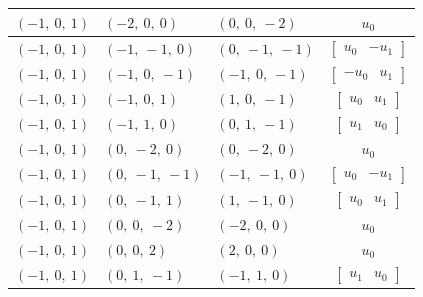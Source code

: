\documentclass[11pt]{article}
\theoremstyle{definition}
\begin{document}
\begin{longtable}{|l|l|l|c|}
    \hline
    $\left( -1, \  0, \  1\right)$ & $\left( -2, \  0, \  0\right)$ & $\left( 0, \  0, \  -2\right)$ & $u_{0}$ \\
    \hline
    $\left( -1, \  0, \  1\right)$ & $\left( -1, \  -1, \  0\right)$ & $\left( 0, \  -1, \  -1\right)$ & $\left[\begin{matrix}u_{0} & - u_{1}\end{matrix}\right]$ \\
    \hline
    $\left( -1, \  0, \  1\right)$ & $\left( -1, \  0, \  -1\right)$ & $\left( -1, \  0, \  -1\right)$ & $\left[\begin{matrix}- u_{0} & u_{1}\end{matrix}\right]$ \\
    \hline
    $\left( -1, \  0, \  1\right)$ & $\left( -1, \  0, \  1\right)$ & $\left( 1, \  0, \  -1\right)$ & $\left[\begin{matrix}u_{0} & u_{1}\end{matrix}\right]$ \\
    \hline
    $\left( -1, \  0, \  1\right)$ & $\left( -1, \  1, \  0\right)$ & $\left( 0, \  1, \  -1\right)$ & $\left[\begin{matrix}u_{1} & u_{0}\end{matrix}\right]$ \\
    \hline
    $\left( -1, \  0, \  1\right)$ & $\left( 0, \  -2, \  0\right)$ & $\left( 0, \  -2, \  0\right)$ & $u_{0}$ \\
    \hline
    $\left( -1, \  0, \  1\right)$ & $\left( 0, \  -1, \  -1\right)$ & $\left( -1, \  -1, \  0\right)$ & $\left[\begin{matrix}u_{0} & - u_{1}\end{matrix}\right]$ \\
    \hline
    $\left( -1, \  0, \  1\right)$ & $\left( 0, \  -1, \  1\right)$ & $\left( 1, \  -1, \  0\right)$ & $\left[\begin{matrix}u_{0} & u_{1}\end{matrix}\right]$ \\
    \hline
    $\left( -1, \  0, \  1\right)$ & $\left( 0, \  0, \  -2\right)$ & $\left( -2, \  0, \  0\right)$ & $u_{0}$ \\
    \hline
    $\left( -1, \  0, \  1\right)$ & $\left( 0, \  0, \  2\right)$ & $\left( 2, \  0, \  0\right)$ & $u_{0}$ \\
    \hline
    $\left( -1, \  0, \  1\right)$ & $\left( 0, \  1, \  -1\right)$ & $\left( -1, \  1, \  0\right)$ & $\left[\begin{matrix}u_{1} & u_{0}\end{matrix}\right]$ \\

\end{longtable}
\end{document}
